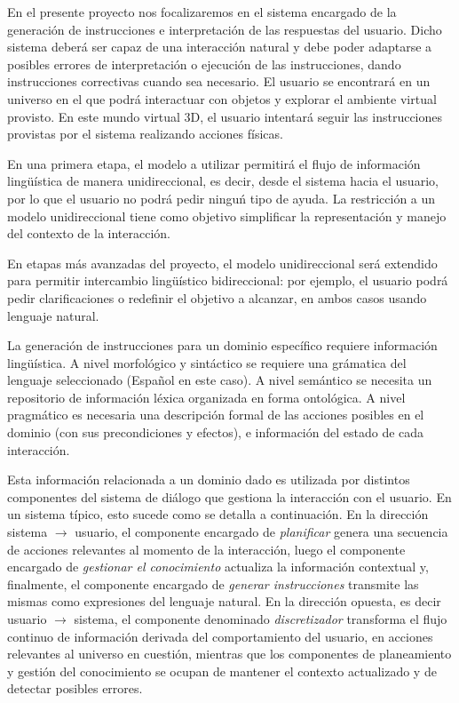 

En el presente proyecto nos focalizaremos en el sistema encargado de la
generaci\'on de  instrucciones e interpretaci\'on de las respuestas del usuario.
Dicho sistema deber\'a ser capaz de una interacci\'on natural y debe poder adaptarse a
posibles errores de interpretaci\'on o ejecuci\'on de las instrucciones, dando
instrucciones correctivas cuando sea necesario. El usuario se encontrar\'a
en un universo en el que podr\'a interactuar con objetos y explorar el ambiente
virtual provisto. En este mundo virtual 3D, el usuario intentar\'a seguir las instrucciones
provistas por el sistema realizando acciones f\'isicas.

En una primera etapa, el modelo a utilizar permitir\'a el flujo de informaci\'on
ling\"u\'istica de manera unidireccional, es decir,
desde el sistema hacia el usuario, por lo que
el usuario no podr\'a pedir ningu\'n tipo de ayuda.  La restricci\'on a un
modelo unidireccional tiene como objetivo
simplificar la representaci\'on y manejo del contexto de la interacci\'on.

En etapas m\'as avanzadas del proyecto, el modelo unidireccional ser\'a
extendido para
permitir intercambio ling\"u\'istico bidireccional: por ejemplo, el usuario
podr\'a
pedir clarificaciones o redefinir el objetivo a alcanzar, en ambos casos usando
lenguaje natural.

La generaci\'on de instrucciones para un dominio espec\'ifico requiere 
informaci\'on  ling\"u\'istica.
A nivel morfol\'ogico y sint\'actico se requiere una
gr\'amatica del lenguaje seleccionado (Espa\~nol en este caso). A nivel 
sem\'antico se necesita un repositorio de informaci\'on l\'exica organizada en
forma ontol\'ogica. A nivel pragm\'atico es necesaria una descripci\'on formal de
las
acciones posibles en el dominio (con sus precondiciones y efectos), e
informaci\'on del estado de cada interacci\'on.

Esta informaci\'on relacionada a un dominio dado es utilizada por distintos
componentes del sistema de di\'alogo que
gestiona la interacci\'on con el usuario. En un sistema t\'ipico, esto
sucede como se detalla a continuaci\'on.  En la direcci\'on sistema $\rightarrow$
usuario, el componente encargado de \textit{planificar} genera una secuencia de
acciones relevantes al momento de la interacci\'on, luego el componente
encargado de  \textit{gestionar el conocimiento} actualiza la informaci\'on
contextual y,  finalmente, el componente encargado de
\textit{generar instrucciones}  transmite las mismas como expresiones
del lenguaje natural.  En la direcci\'on opuesta, es decir usuario $\rightarrow$
sistema,  el componente denominado \textit{discretizador}
transforma el flujo continuo de informaci\'on derivada del comportamiento del
usuario, en acciones relevantes al universo en cuesti\'on, mientras que
los componentes de planeamiento y gesti\'on del conocimiento se ocupan
de mantener el contexto actualizado y de detectar posibles errores.

